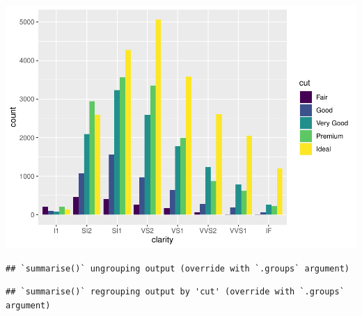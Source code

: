 \documentclass[
]{book}
\newenvironment{Shaded}{\begin{snugshade}}{\end{snugshade}}
\newcommand{\CommentTok}[1]{\textcolor[rgb]{0.56,0.35,0.01}{\textit{#1}}}
\newcommand{\DataTypeTok}[1]{\textcolor[rgb]{0.13,0.29,0.53}{#1}}
\newcommand{\KeywordTok}[1]{\textcolor[rgb]{0.13,0.29,0.53}{\textbf{#1}}}
\newcommand{\NormalTok}[1]{#1}
\newcommand{\OperatorTok}[1]{\textcolor[rgb]{0.81,0.36,0.00}{\textbf{#1}}}
\newcommand{\StringTok}[1]{\textcolor[rgb]{0.31,0.60,0.02}{#1}}
\begin{document}
\includegraphics{_main_files/figure-latex/unnamed-chunk-256-7.pdf}

\begin{Shaded}
\end{Shaded}

\begin{verbatim}
## `summarise()` ungrouping output (override with `.groups` argument)
\end{verbatim}

\begin{Shaded}
\end{Shaded}

\begin{verbatim}
## `summarise()` regrouping output by 'cut' (override with `.groups` argument)
\end{verbatim}
\end{document}
